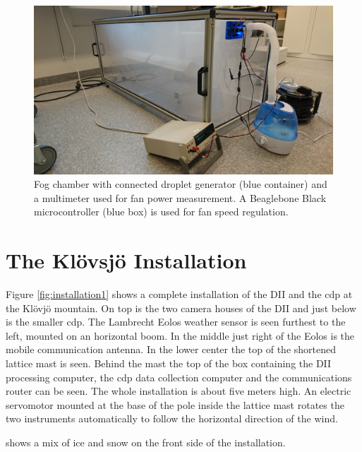 \begin{figure}[ht]
\centering\includegraphics[width=0.75\linewidth]{figures/DSC_0103}
\caption{Fog chamber with connected droplet generator (blue container) and a multimeter used for fan power measurement. A Beaglebone Black microcontroller (blue box) is used for fan speed regulation.}
\end{figure}

\section{The Klövsjö Installation}
Figure \ref{fig:installation1} shows a complete installation of the DII and the \gls{cdp} at the Klövjö mountain. On top is the two camera houses of the DII and just below is the smaller \gls{cdp}. The Lambrecht Eolos weather sensor is seen furthest to the left, mounted on an horizontal boom. In the middle just right of the Eolos is the mobile communication antenna. In the lower center the top of the shortened lattice mast is seen. Behind the mast the top of the box containing the DII processing computer, the \gls{cdp} data collection computer and the communications router can be seen. The whole installation is about five meters high. An electric servomotor mounted at the base of the pole inside the lattice mast rotates the two instruments automatically to follow the horizontal direction of the wind. 

 shows a mix of ice and snow on the front side of the installation.

